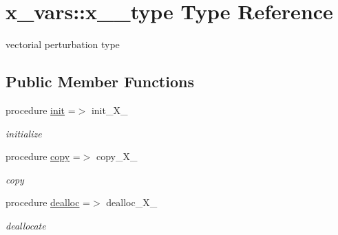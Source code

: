 \hypertarget{structx__vars_1_1x__1__type}{}\section{x\+\_\+vars\+:\+:x\+\_\+\_\+type Type Reference}
\label{structx__vars_1_1x__1__type}


vectorial perturbation type  


\subsection*{Public Member Functions}
\begin{DoxyCompactItemize}
\item 
procedure \hyperlink{structx__vars_1_1x__1__type_a519c9ca8ceb73fb7010a587fab3248f8}{init} =$>$ init\+\_\+\+X\+\_
\begin{DoxyCompactList}\small\item\em initialize \end{DoxyCompactList}\item 
procedure \hyperlink{structx__vars_1_1x__1__type_a8150516389a9cfe7716b0fe70ff6aeab}{copy} =$>$ copy\+\_\+\+X\+\_
\begin{DoxyCompactList}\small\item\em copy \end{DoxyCompactList}\item 
procedure \hyperlink{structx__vars_1_1x__1__type_aee743fbc89e8e5486495ae3f6c49bd09}{dealloc} =$>$ dealloc\+\_\+\+X\+\_
\begin{DoxyCompactList}\small\item\em deallocate \end{DoxyCompactList}\end{DoxyCompactItemize}
